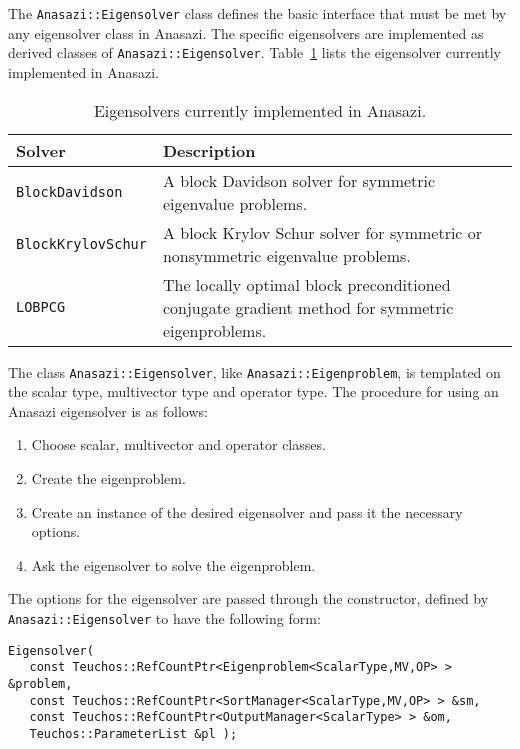 The \verb!Anasazi::Eigensolver! class defines the basic interface that must be
met by any eigensolver class in Anasazi. The specific eigensolvers are
implemented as derived classes of \verb!Anasazi::Eigensolver!.
Table~\ref{tab:anasazi:solvers} lists the eigensolver currently implemented in
Anasazi.

\begin{table}[htp]
\begin{center}
\begin{tabular}{| p{4cm} p{8cm} |}
\hline
Solver & Description \\
\hline
{\tt BlockDavidson}    & A block Davidson solver for symmetric
                         eigenvalue problems.\\
{\tt BlockKrylovSchur} & A block Krylov Schur solver for symmetric or
                         nonsymmetric eigenvalue problems.\\
{\tt LOBPCG} & The locally optimal block preconditioned conjugate gradient
method for symmetric eigenproblems.\\
\hline
\end{tabular}
\caption{Eigensolvers currently implemented in Anasazi.}
\label{tab:anasazi:solvers}
\end{center}
\end{table}

The class \verb!Anasazi::Eigensolver!, like \verb!Anasazi::Eigenproblem!, is
templated on the scalar type, multivector type and operator
type. The procedure for using an Anasazi eigensolver is as follows:
\begin{enumerate}
\item Choose scalar, multivector and operator classes.
\item Create the eigenproblem.
\item Create an instance of the desired eigensolver and pass it the necessary
options.
\item Ask the eigensolver to solve the eigenproblem.
\end{enumerate}

The options for the eigensolver are passed through the constructor, defined by
\verb!Anasazi::Eigensolver! to have the following form:
\begin{verbatim}
Eigensolver( 
   const Teuchos::RefCountPtr<Eigenproblem<ScalarType,MV,OP> > &problem, 
   const Teuchos::RefCountPtr<SortManager<ScalarType,MV,OP> > &sm,
   const Teuchos::RefCountPtr<OutputManager<ScalarType> > &om,
   Teuchos::ParameterList &pl );
\end{verbatim}

